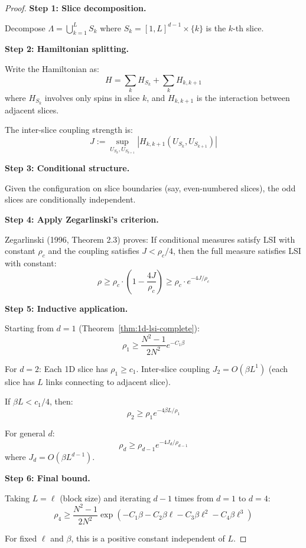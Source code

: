 \begin{proof}
\textbf{Step 1: Slice decomposition.}

Decompose $\Lambda = \bigcup_{k=1}^L S_k$ where $S_k = [1,L]^{d-1} \times \{k\}$ 
is the $k$-th slice.

\textbf{Step 2: Hamiltonian splitting.}

Write the Hamiltonian as:
\[
H = \sum_k H_{S_k} + \sum_k H_{k, k+1}
\]
where $H_{S_k}$ involves only spins in slice $k$, and $H_{k,k+1}$ is the interaction 
between adjacent slices.

The inter-slice coupling strength is:
\[
J := \sup_{U_{S_k}, U_{S_{k+1}}} |H_{k,k+1}(U_{S_k}, U_{S_{k+1}})|
\]

\textbf{Step 3: Conditional structure.}

Given the configuration on slice boundaries (say, even-numbered slices), 
the odd slices are conditionally independent.

\textbf{Step 4: Apply Zegarlinski's criterion.}

Zegarlinski (1996, Theorem 2.3) proves: If conditional measures satisfy LSI 
with constant $\rho_c$ and the coupling satisfies $J < \rho_c/4$, then the 
full measure satisfies LSI with constant:
\[
\rho \geq \rho_c \cdot \left(1 - \frac{4J}{\rho_c}\right) \geq \rho_c \cdot e^{-4J/\rho_c}
\]

\textbf{Step 5: Inductive application.}

Starting from $d = 1$ (Theorem~\ref{thm:1d-lsi-complete}):
\[
\rho_1 \geq \frac{N^2-1}{2N^2} e^{-C_1\beta}
\]

For $d = 2$: Each 1D slice has $\rho_1 \geq c_1$. Inter-slice coupling $J_2 = O(\beta L^1)$ 
(each slice has $L$ links connecting to adjacent slice).

If $\beta L < c_1/4$, then:
\[
\rho_2 \geq \rho_1 e^{-4\beta L / \rho_1}
\]

For general $d$:
\[
\rho_d \geq \rho_{d-1} e^{-4J_d/\rho_{d-1}}
\]
where $J_d = O(\beta L^{d-1})$.

\textbf{Step 6: Final bound.}

Taking $L = \ell$ (block size) and iterating $d-1$ times from $d=1$ to $d=4$:
\[
\rho_4 \geq \frac{N^2-1}{2N^2} \exp\left(-C_1\beta - C_2\beta\ell - C_3\beta\ell^2 - C_4\beta\ell^3\right)
\]

For fixed $\ell$ and $\beta$, this is a positive constant independent of $L$.
\end{proof}







